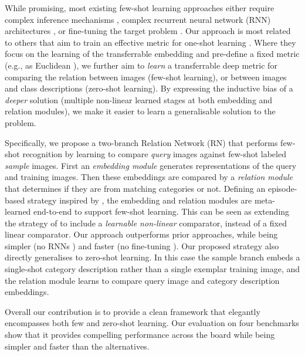 \documentclass[10pt,twocolumn,letterpaper]{article}
\begin{document}
While promising, most existing few-shot learning approaches either require complex inference mechanisms \cite{lake2011one, fei2006one}, complex recurrent neural network (RNN) architectures \cite{vinyals2016matching,santoro2016meta}, or fine-tuning the target problem \cite{finn2017model,ravi2016optimization}. Our approach is most related to others that aim to train an effective metric for one-shot learning \cite{vinyals2016matching,snell2017prototypical,koch2015siamese}. Where they focus on the learning of the transferrable embedding and {pre-define a fixed metric} (e.g., as Euclidean \cite{snell2017prototypical}), we further aim to \emph{learn} a transferrable deep metric for comparing the relation between images (few-shot learning), or between images and class descriptions (zero-shot learning). 
By expressing the inductive bias of a \emph{deeper} solution (multiple non-linear learned stages at both embedding and relation modules), we make it easier to learn a generalisable solution to the problem. 



Specifically, we propose a two-branch Relation Network (RN) that performs few-shot recognition by learning to compare \emph{query} images against few-shot labeled {\em sample} images. First an {\em embedding module} generates representations of the query and training images. Then these embeddings are compared by a {\em relation module} that determines if they are from matching categories or not. Defining an episode-based strategy inspired by \cite{vinyals2016matching,snell2017prototypical}, the embedding and relation modules are meta-learned end-to-end to support few-shot learning. This can be seen as extending the strategy of \cite{vinyals2016matching,snell2017prototypical} to include a \emph{learnable non-linear} comparator, instead of a fixed linear comparator.  Our approach outperforms prior approaches, while being simpler (no RNNs \cite{vinyals2016matching,santoro2016meta,ravi2016optimization}) and faster  (no fine-tuning  \cite{ravi2016optimization,finn2017model}).
Our proposed strategy also directly generalises to zero-shot learning. In this case the sample branch embeds a single-shot category description rather than a single exemplar training image, and the relation module learns to compare query image and category description embeddings.

Overall our contribution is to provide a clean framework that elegantly encompasses both few and zero-shot learning. Our evaluation on four benchmarks show that it provides compelling performance across the board while being simpler and faster than the alternatives.
\end{document}
